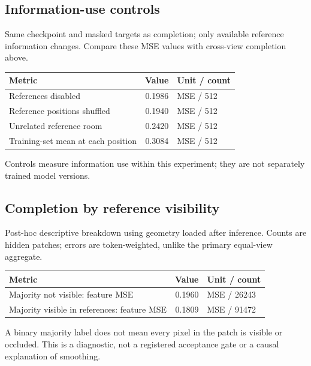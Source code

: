 \documentclass[10pt]{article}
\begin{document}
\subsection{Information-use controls}
Same checkpoint and masked targets as completion; only available reference information changes. Compare these MSE values with cross-view completion above.
\begin{center}\begin{tabular}{p{.57\linewidth}rp{.23\linewidth}}\toprule Metric & Value & Unit / count \\ \midrule
References disabled & 0.1986 & MSE / 512 \\
Reference positions shuffled & 0.1940 & MSE / 512 \\
Unrelated reference room & 0.2420 & MSE / 512 \\
Training-set mean at each position & 0.3084 & MSE / 512 \\
\bottomrule\end{tabular}\end{center}
Controls measure information use within this experiment; they are not separately trained model versions.

\subsection{Completion by reference visibility}
Post-hoc descriptive breakdown using geometry loaded after inference. Counts are hidden patches; errors are token-weighted, unlike the primary equal-view aggregate.
\begin{center}\begin{tabular}{p{.57\linewidth}rp{.23\linewidth}}\toprule Metric & Value & Unit / count \\ \midrule
Majority not visible: feature MSE & 0.1960 & MSE / 26243 \\
Majority visible in references: feature MSE & 0.1809 & MSE / 91472 \\
\bottomrule\end{tabular}\end{center}
A binary majority label does not mean every pixel in the patch is visible or occluded. This is a diagnostic, not a registered acceptance gate or a causal explanation of smoothing.
\end{document}
